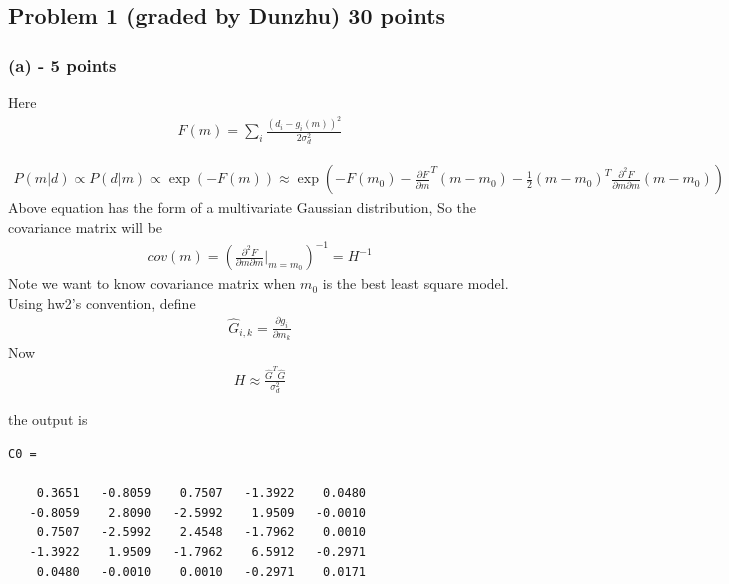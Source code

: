 \documentclass[11pt]{article}
\begin{document}
\lstset{language=Matlab,%
  breaklines=true,%
  morekeywords={matlab2tikz},
  keywordstyle=\color{blue},%
  morekeywords=[2]{1}, keywordstyle=[2]{\color{black}},
  identifierstyle=\color{black},%
  stringstyle=\color{mylilas},
  commentstyle=\color{mygreen},%
  showstringspaces=false,%
  numbers=left,%
  numberstyle={\tiny \color{black}},%
  numbersep=9pt, %
  emph=[1]{for,end,break},emphstyle=[1]\color{red}, %
}


\subsection*{Problem 1 (graded by Dunzhu) 30 points}
\subsubsection*{(a) - 5 points}

Here 
\begin{eqnarray*}
F(m) = \sum_i \frac{ (d_i - g_i(m))^2}{2 \sigma_d ^2}
\end{eqnarray*}

\begin{eqnarray*}
P(m | d) \propto P(d|m) \propto \exp\left( -F(m) \right) \approx \exp\left( 
-F(m_0) - \frac{\partial F}{\partial m}^T (m-m_0) - \frac{1}{2}(m-m_0)^T \frac{\partial^2 F}{\partial m \partial m} (m-m_0) 
\right) 
\end{eqnarray*}
Above equation has the form of a multivariate Gaussian distribution, So the covariance matrix will be
\begin{eqnarray*}
cov(m) = \left( \frac{\partial^2 F}{\partial m \partial m} |_{m=m_0} \right)^{-1} = H^{-1}
\end{eqnarray*}
Note we want to know covariance matrix when $m_0$ is the best least square model. Using hw2's convention, define
\begin{eqnarray*}
\hat{G}_{i,k} = \frac{\partial g_i}{\partial m_k}
\end{eqnarray*}
Now
\begin{eqnarray*}
H \approx \frac{\hat{G}^{T}\hat{G}}{\sigma_d^2}
\end{eqnarray*}



the output is
\begin{verbatim}
C0 =

    0.3651   -0.8059    0.7507   -1.3922    0.0480
   -0.8059    2.8090   -2.5992    1.9509   -0.0010
    0.7507   -2.5992    2.4548   -1.7962    0.0010
   -1.3922    1.9509   -1.7962    6.5912   -0.2971
    0.0480   -0.0010    0.0010   -0.2971    0.0171


\end{verbatim}
\end{document}
